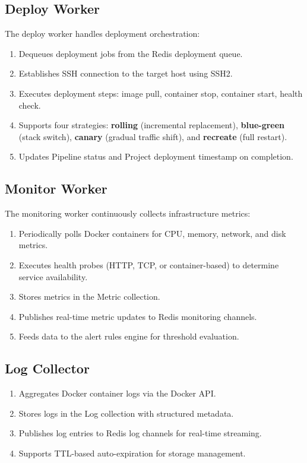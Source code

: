 \documentclass[12pt,a4paper,twoside]{report}
\begin{document}
\subsection{Deploy Worker}

The deploy worker handles deployment orchestration:

\begin{enumerate}[noitemsep]
  \item Dequeues deployment jobs from the Redis deployment queue.
  \item Establishes SSH connection to the target host using SSH2.
  \item Executes deployment steps: image pull, container stop, container start, health check.
  \item Supports four strategies: \textbf{rolling} (incremental replacement), \textbf{blue-green} (stack switch), \textbf{canary} (gradual traffic shift), and \textbf{recreate} (full restart).
  \item Updates Pipeline status and Project deployment timestamp on completion.
\end{enumerate}

\subsection{Monitor Worker}

The monitoring worker continuously collects infrastructure metrics:

\begin{enumerate}[noitemsep]
  \item Periodically polls Docker containers for CPU, memory, network, and disk metrics.
  \item Executes health probes (HTTP, TCP, or container-based) to determine service availability.
  \item Stores metrics in the Metric collection.
  \item Publishes real-time metric updates to Redis monitoring channels.
  \item Feeds data to the alert rules engine for threshold evaluation.
\end{enumerate}

\subsection{Log Collector}

\begin{enumerate}[noitemsep]
  \item Aggregates Docker container logs via the Docker API.
  \item Stores logs in the Log collection with structured metadata.
  \item Publishes log entries to Redis log channels for real-time streaming.
  \item Supports TTL-based auto-expiration for storage management.
\end{enumerate}
\end{document}
